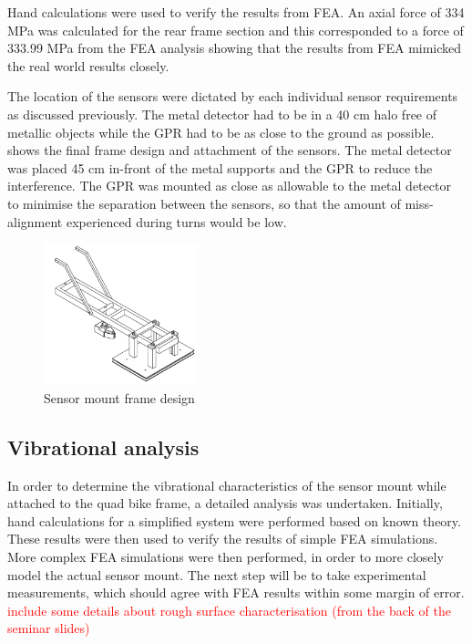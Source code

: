 \documentclass[main.tex]{subfiles}
\begin{document}
Hand calculations were used to verify the results from FEA. An axial force of 334 MPa was calculated for the rear frame section and this corresponded to a force of 333.99 MPa from the FEA analysis showing that the results from FEA mimicked the real world results closely. 

The location of the sensors were dictated by each individual sensor requirements as discussed previously. The metal detector had to be in a 40 cm halo free of metallic objects while the GPR had to be as close to the ground as possible.  shows the final frame design and attachment of the sensors. The metal detector was placed 45 cm in-front of the metal supports and the GPR to reduce the interference. The GPR was mounted as close as allowable to the metal detector to minimise the separation between the sensors, so that the amount of miss-alignment experienced during turns would be low.  

\begin{figure}[ht]
\includegraphics[width=0.4\textwidth]{4-DetailedDesign/frame.PNG}
\centering
\caption{Sensor mount frame design} 
\end{figure} 

\subsection{Vibrational analysis}
In order to determine the vibrational characteristics of the sensor mount while attached to the quad bike frame, a detailed analysis was undertaken. Initially, hand calculations for a simplified system were performed based on known theory. These results were then used to verify the results of simple FEA simulations. More complex FEA simulations were then performed, in order to more closely model the actual sensor mount. The next step will be to take experimental measurements, which should agree with FEA results within some margin of error. 
 \textcolor{red}{include some details about rough surface characterisation (from the back of the seminar slides) }
\end{document}
